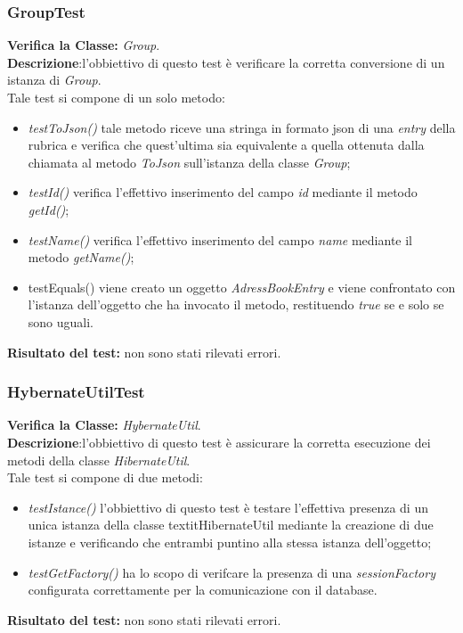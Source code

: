 \subsubsection{GroupTest}
\textbf{Verifica la Classe:} \textit{Group}.\\
\textbf{Descrizione}:l'obbiettivo di questo test è verificare la corretta conversione di un istanza di \textit{Group}.\\
Tale test si compone di un solo metodo:
\begin{itemize}
\item \textit{testToJson() } tale metodo riceve una stringa in formato json di una 	\textit{entry} della rubrica e verifica che quest'ultima sia equivalente a quella ottenuta dalla chiamata al metodo \textit{ToJson} sull'istanza della classe \textit{Group};
\item \textit{testId() } verifica l'effettivo inserimento del campo \textit{id} mediante il metodo \textit{getId()};
\item \textit{testName() } verifica l'effettivo inserimento del campo \textit{name} mediante il metodo \textit{getName()}; %
\item{testEquals()} viene creato un oggetto \textit{AdressBookEntry} e viene confrontato con l'istanza dell'oggetto che ha invocato il metodo, restituendo \textit{true} se e solo se sono uguali.
\end{itemize}
\textbf{Risultato del test:} non sono stati rilevati errori.

\subsubsection{HybernateUtilTest}
\textbf{Verifica la Classe:} \textit{HybernateUtil}.\\
\textbf{Descrizione}:l'obbiettivo di questo test è assicurare la corretta esecuzione dei metodi della classe \textit{HibernateUtil}. \\
Tale test si compone di due metodi:
\begin{itemize}
\item \textit{testIstance() } l'obbiettivo di questo test è testare l'effettiva presenza di un unica istanza della classe textit{HibernateUtil} mediante la creazione di due istanze e verificando che entrambi puntino alla stessa istanza dell'oggetto;
\item \textit{testGetFactory()} ha lo scopo di verifcare la presenza di una \textit{sessionFactory} configurata correttamente per la comunicazione con il database.
\end{itemize}
\textbf{Risultato del test:} non sono stati rilevati errori.

